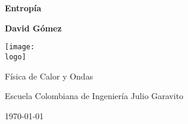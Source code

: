 \documentclass{article}
\newcommand{\logo}{"logo-eci-invert.png"}
\newcommand{\titlename}{Entropía}
\renewcommand{\author}{{David Gómez}}
\begin{document}
\begin{titlepage}
    \begin{center}
        \vspace{1cm}

        \textbf{\Huge{\titlename}}

        \vspace{1.5cm}

        \textbf{\large{\author}}

        \vspace{3cm}

        \texttt{[image: \\logo]}
        
        \vfill

        Física de Calor y Ondas

        Escuela Colombiana de Ingeniería Julio Garavito

        \today
    \end{center}
\end{titlepage}

\clearpage
\tableofcontents






\end{document}
